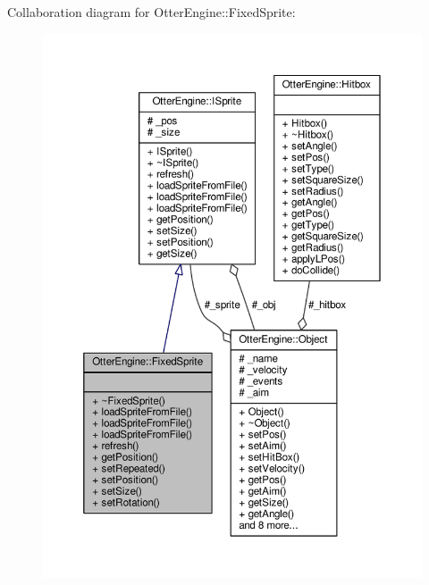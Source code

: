 Collaboration diagram for Otter\+Engine\+:\+:Fixed\+Sprite\+:\nopagebreak
\begin{figure}[H]
\begin{center}
\leavevmode
\includegraphics[width=350pt]{de/d43/class_otter_engine_1_1_fixed_sprite__coll__graph}
\end{center}
\end{figure}
